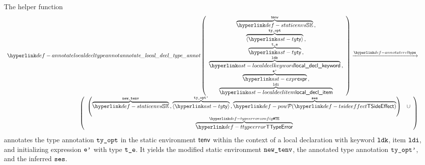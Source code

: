 \hypertarget{def-annotatelocaldecltypeannot}{}
The helper function
\[
\begin{array}{r}
  \annotatelocaldecltypeannot
  \left(
  \begin{array}{c}
    \overname{\staticenvs}{\tenv} \aslsep \\
    \overname{\langle\ty\rangle}{\tyopt} \aslsep \\
    \overname{\ty}{\vte} \aslsep \\
    \overname{\localdeclkeyword}{\ldk} \aslsep \\
    \overname{\expr}{\vep} \aslsep\\
    \overname{\localdeclitem}{\ldi}
  \end{array}
  \right)
  \typearrow \\
  \left(
  \begin{array}{cl}
    \left(\overname{\staticenvs}{\newtenv} \aslsep \overname{\langle\ty\rangle}{\tyoptp} \aslsep \overname{\TSideEffectSet}{\vses}\right)
    & \cup \\
    \overname{\TTypeError}{\TypeErrorConfig} &
  \end{array}
  \right)
\end{array}
\]
annotates the type annotation $\texttt{ty\_opt}$ in the static environment $\textsf{tenv}$ within the context of a local declaration with keyword $\texttt{ldk}$, item $\texttt{ldi}$, and initializing expression $\texttt{e'}$ with type $\texttt{t\_e}$.
It yields the modified static environment $\texttt{new\_tenv}$, the annotated type annotation $\texttt{ty\_opt'}$, and the inferred \sideeffectsetterm{} $\texttt{ses}$.
\ProseOtherwiseTypeError


